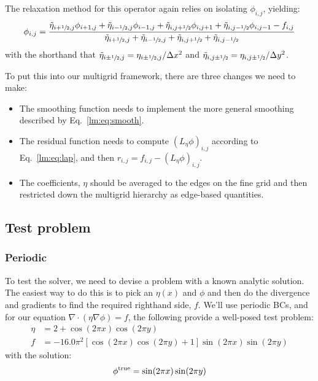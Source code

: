 The relaxation method for this operator again relies on isolating
$\phi_{i,j}$, yielding:
\begin{equation}
\phi_{i,j} = \frac{\tilde{\eta}_{i+{\sfrac{1}{2}},j}\phi_{i+1,j} + \tilde{\eta}_{i-{\sfrac{1}{2}},j}\phi_{i-1,j} +
                   \tilde{\eta}_{i,j+{\sfrac{1}{2}}}\phi_{i,j+1} + \tilde{\eta}_{i,j-{\sfrac{1}{2}}}\phi_{i,j-1} -
                   f_{i,j} } 
                  {\tilde{\eta}_{i+{\sfrac{1}{2}},j} + \tilde{\eta}_{i-{\sfrac{1}{2}},j} + 
                   \tilde{\eta}_{i,j+{\sfrac{1}{2}}} + \tilde{\eta}_{i,j-{\sfrac{1}{2}}}}
\label{lm:eq:smooth}
\end{equation}
with the shorthand that $\tilde{\eta}_{i\pm{\sfrac{1}{2}},j} = \eta_{i\pm{\sfrac{1}{2}},j}/\Delta x^2$
and $\tilde{\eta}_{i,j\pm{\sfrac{1}{2}}} = \eta_{i,j\pm{\sfrac{1}{2}}}/\Delta y^2$.

To put this into our multigrid framework, there are three changes we
need to make:
\begin{itemize}
\item The smoothing function needs to implement the more general smoothing
described by Eq.~\ref{lm:eq:smooth}.

\item The residual function needs to compute $(L_\eta \phi)_{i,j}$ according
to Eq.~\ref{lm:eq:lap}, and then $r_{i,j} = f_{i,j} - (L_\eta \phi)_{i,j}$.

\item The coefficients, $\eta$ should be averaged to the edges on the fine
grid and then restricted down the multigrid hierarchy as edge-based 
quantities.
\end{itemize}

\subsection{Test problem}

\subsubsection{Periodic}

\label{sec:lm:periodicbcs}

To test the solver, we need to devise a problem with a known analytic
solution.  The easiest way to do this is to pick an $\eta(x)$ and
$\phi$ and then do the divergence and gradients to find the required
righthand side, $f$.  We'll use periodic BCs, and for our
equation $\nabla \cdot ( \eta \nabla \phi ) = f$, the following
provide a well-posed test problem:
\begin{align}
\eta &= 2 + \cos(2\pi x) \cos(2\pi y)  \label{eq:vc:lap}
\\
f &= -16.0 \pi^2 \left [ \cos(2\pi x)\cos(2\pi y) + 1 \right ] \sin(2\pi x)\sin(2 \pi y) \nonumber
\end{align}
with the solution:
\begin{equation}
\phi^\mathrm{true} = \sin(2 \pi x) \sin(2\pi y) \nonumber \\
\end{equation}

